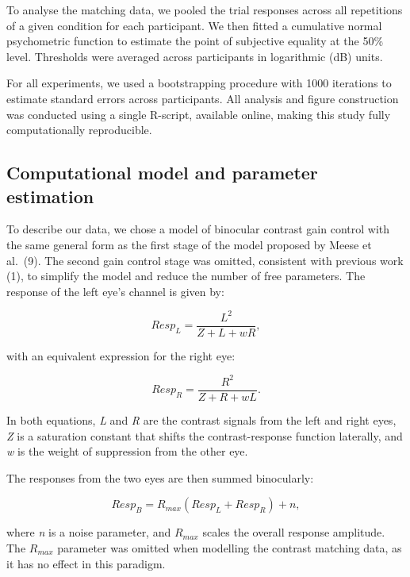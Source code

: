 \documentclass[
]{article}
\begin{document}
To analyse the matching data, we pooled the trial responses across all repetitions of a given condition for each participant. We then fitted a cumulative normal psychometric function to estimate the point of subjective equality at the 50\% level. Thresholds were averaged across participants in logarithmic (dB) units.

For all experiments, we used a bootstrapping procedure with 1000 iterations to estimate standard errors across participants. All analysis and figure construction was conducted using a single R-script, available online, making this study fully computationally reproducible.

\hypertarget{computational-model-and-parameter-estimation}{%
\subsection{Computational model and parameter estimation}\label{computational-model-and-parameter-estimation}}

To describe our data, we chose a model of binocular contrast gain control with the same general form as the first stage of the model proposed by Meese et al.~(9). The second gain control stage was omitted, consistent with previous work (1), to simplify the model and reduce the number of free parameters. The response of the left eye's channel is given by:

\begin{equation}
\label{eq:respL}
Resp_L = \frac{L^2}{Z + L + wR},
\end{equation}

with an equivalent expression for the right eye:

\begin{equation}
\label{eq:respR}
Resp_R = \frac{R^2}{Z + R + wL}.
\end{equation}

In both equations, \emph{L} and \emph{R} are the contrast signals from the left and right eyes, \emph{Z} is a saturation constant that shifts the contrast-response function laterally, and \emph{w} is the weight of suppression from the other eye.

The responses from the two eyes are then summed binocularly:

\begin{equation}
\label{eq:respB}
Resp_B = R_{max}(Resp_L + Resp_R) + n,
\end{equation}

where \emph{n} is a noise parameter, and \(R_{max}\) scales the overall response amplitude. The \(R_{max}\) parameter was omitted when modelling the contrast matching data, as it has no effect in this paradigm.
\end{document}
